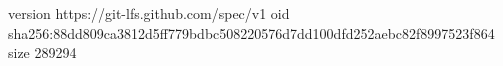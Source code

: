 version https://git-lfs.github.com/spec/v1
oid sha256:88dd809ca3812d5ff779bdbc508220576d7dd100dfd252aebc82f8997523f864
size 289294
